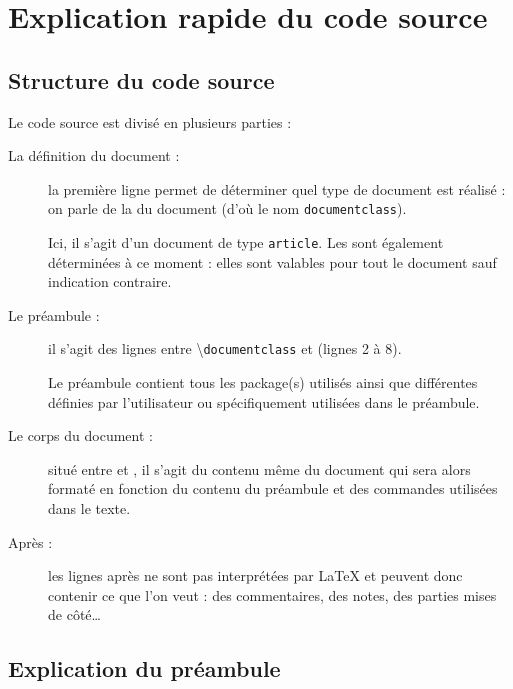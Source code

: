 \section{Explication rapide du code source}
\subsection{Structure du code source}

Le code source est divisé en plusieurs parties :
\begin{description}
    \item[La définition du document :] la première ligne permet de déterminer quel type de document est réalisé : on parle de la  du document (d'où le nom \verb!documentclass!). 
    
    Ici, il s'agit d'un document de type \verb!article!. Les  sont également déterminées à ce moment : elles sont valables pour tout le document sauf indication contraire.
    \item[Le préambule :] il s'agit des lignes entre \textbackslash\verb!documentclass! et \verb!! (lignes 2 à 8). 
    
    Le préambule contient tous les package(s) utilisés ainsi que différentes  définies par l'utilisateur ou spécifiquement utilisées dans le préambule.
    \item[Le corps du document :] situé entre \verb!! et \verb!!,
        il s'agit du contenu même du document qui sera alors formaté en fonction du contenu du préambule et des commandes utilisées dans le texte.
    \item[Après :] les lignes après \verb!!
        ne sont pas interprétées par \LaTeX{} et peuvent donc contenir ce que l'on veut : des commentaires, des notes, des parties mises de côté\dots
\end{description}

\subsection{Explication du préambule}

